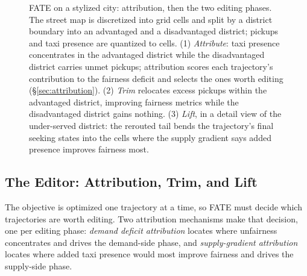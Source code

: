 \begin{figure}[t]
  \centering
  
  \caption{FATE on a stylized city: attribution, then the two editing
  phases. The street map is discretized into grid cells and split by a
  district boundary into an advantaged and a disadvantaged district;
  pickups and taxi presence are quantized to cells. (1) \emph{Attribute}:
  taxi presence concentrates in the advantaged district while the
  disadvantaged district carries unmet pickups; attribution scores each
  trajectory's contribution to the fairness deficit and selects the ones
  worth editing (\S\ref{sec:attribution}). (2) \emph{Trim} relocates excess
  pickups within the advantaged district, improving fairness metrics while
  the disadvantaged district gains nothing. (3) \emph{Lift}, in a detail
  view of the under-served district: the rerouted tail bends the
  trajectory's final seeking states into the cells where the supply
  gradient says added presence improves fairness most.}
  \label{fig:overview}
\end{figure}
\subsection{The Editor: Attribution, Trim, and Lift}\label{sec:editor}

\label{sec:attribution}%
The objective is optimized one trajectory at a time, so FATE must decide which
trajectories are worth editing. Two attribution mechanisms
make that decision, one per editing phase: \emph{demand deficit attribution}
locates where unfairness concentrates and drives the demand-side
phase, and \emph{supply-gradient attribution} locates where added taxi presence
would most improve fairness and drives the supply-side phase.

